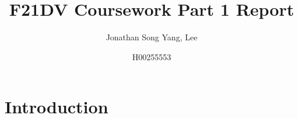 \documentclass{article}
\title{F21DV Coursework Part 1 Report}
\author{Jonathan Song Yang, Lee}
\date{H00255553}
\begin{document}
\maketitle

\newpage
\section{Introduction}
\end{document}
